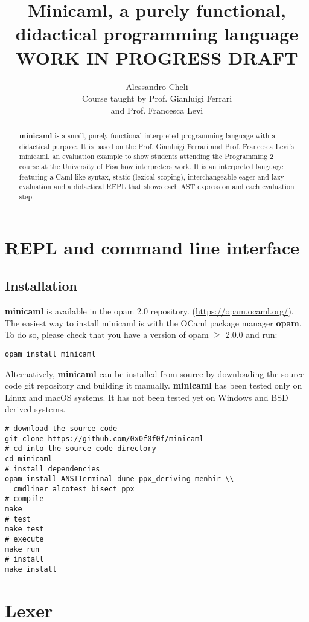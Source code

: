 \documentclass[a4paper, 10pt]{article}
\title{Minicaml, a purely functional, didactical programming language\\WORK IN PROGRESS DRAFT}
\author{Alessandro Cheli\\Course taught by Prof. Gianluigi Ferrari\\and Prof. Francesca Levi}
\theoremstyle{plain}%
\theoremstyle{definition}
\theoremstyle{remark}
\begin{document}
\maketitle

\begin{abstract}
\textbf{minicaml} is a small, purely functional interpreted programming language
with a didactical purpose. It is based on the Prof. Gianluigi Ferrari and Prof.
Francesca Levi's minicaml, an evaluation example to show students attending the
Programming 2 course at the University of Pisa how interpreters work. It is an
interpreted language featuring a Caml-like syntax, static (lexical scoping),
interchangeable eager and lazy evaluation and a didactical REPL that
shows each AST expression and each evaluation step.
\end{abstract}

\section{REPL and command line interface}
\subsection{Installation}
\textbf{minicaml} is available in the opam 2.0 repository.
(\url{https://opam.ocaml.org/}). The easiest way to install minicaml is with the
OCaml package manager \textbf{opam}. To do so, please check that you have a version of opam $\geq$
2.0.0 and run:
\begin{lstlisting}[style=bash]
opam install minicaml
\end{lstlisting}
Alternatively, \textbf{minicaml} can be installed from source by downloading the
source code git repository and building it manually. \textbf{minicaml} has been tested
only on Linux and macOS systems. It has not been tested yet on Windows and BSD
derived systems.
\begin{lstlisting}[style=bash]
# download the source code
git clone https://github.com/0x0f0f0f/minicaml
# cd into the source code directory
cd minicaml
# install dependencies
opam install ANSITerminal dune ppx_deriving menhir \\
  cmdliner alcotest bisect_ppx
# compile
make
# test
make test
# execute
make run
# install
make install
\end{lstlisting}

\clearpage



\section{Lexer}
\end{document}
